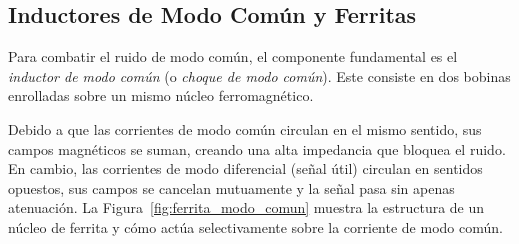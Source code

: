\begin{marginfigure}
    \centering
    \caption[Esquema de condensador de desacoplo.]{Ubicación y función de un condensador de desacoplo. Al colocarse inmediatamente antes del consumidor, absorbe los transitorios de corriente y evita que el ruido de modo diferencial contamine la línea de alimentación común.}\label{fig:desacoplo}
\end{marginfigure}

\subsection{Inductores de Modo Común y Ferritas}\label{sub:ferritas}

Para combatir el ruido de modo común, el componente fundamental es el \emph{inductor de modo común} (o \emph{choque de modo común}). Este consiste en dos bobinas enrolladas sobre un mismo núcleo ferromagnético. 

Debido a que las corrientes de modo común circulan en el mismo sentido, sus campos magnéticos se suman, creando una alta impedancia que bloquea el ruido. En cambio, las corrientes de modo diferencial (señal útil) circulan en sentidos opuestos, sus campos se cancelan mutuamente y la señal pasa sin apenas atenuación. La Figura~\ref{fig:ferrita_modo_comun} muestra la estructura de un núcleo de ferrita y cómo actúa selectivamente sobre la corriente de modo común.

